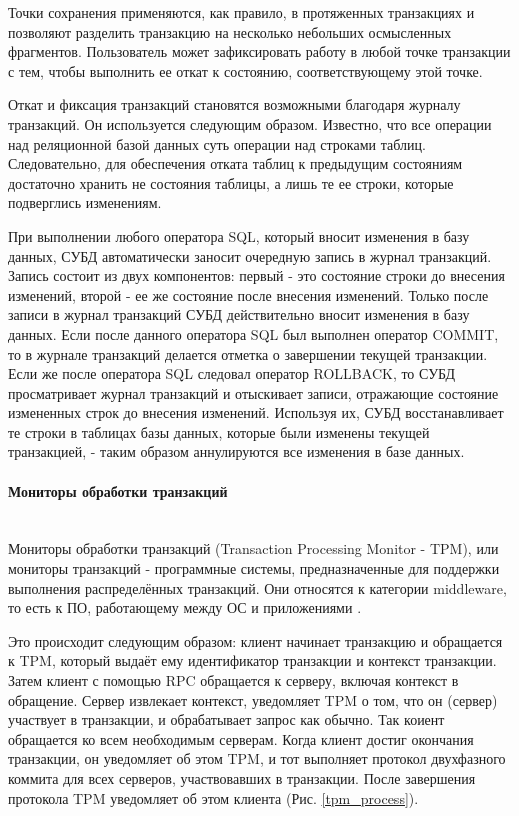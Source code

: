 Точки сохранения применяются, как правило, в протяженных транзакциях и позволяют разделить транзакцию на несколько
небольших осмысленных фрагментов. Пользователь может зафиксировать работу в любой точке транзакции с тем,
чтобы выполнить ее откат к состоянию, соответствующему этой точке.

Откат и фиксация транзакций становятся возможными благодаря журналу транзакций. Он используется следующим образом.
Известно, что все операции над реляционной базой данных суть операции над строками таблиц. Следовательно,
для обеспечения отката таблиц к предыдущим состояниям достаточно хранить не состояния таблицы, а лишь те
ее строки, которые подверглись изменениям.

При выполнении любого оператора SQL, который вносит изменения в базу данных, СУБД автоматически заносит
очередную запись в журнал транзакций. Запись состоит из двух компонентов: первый - это состояние строки до
внесения изменений, второй - ее же состояние после внесения изменений. Только после записи в журнал транзакций
СУБД действительно вносит изменения в базу данных. Если после данного оператора SQL был выполнен оператор
COMMIT, то в журнале транзакций делается отметка о завершении текущей транзакции. Если же после
оператора SQL следовал оператор ROLLBACK, то СУБД просматривает журнал транзакций и отыскивает записи,
отражающие состояние измененных строк до внесения изменений. Используя их, СУБД восстанавливает те
строки в таблицах базы данных, которые были изменены текущей транзакцией, - таким образом
аннулируются все изменения в базе данных.

\paragraph{Мониторы обработки транзакций}~\\
Мониторы обработки транзакций (Transaction Processing Monitor - TPM), или мониторы
транзакций - программные системы, предназначенные для поддержки выполнения распределённых транзакций.
Они относятся к категории middleware, то есть к ПО, работающему между ОС и приложениями \autocite{TransactionMonitors}.

Это происходит следующим образом: клиент начинает транзакцию и обращается к TPM, который выдаёт ему
идентификатор транзакции и контекст транзакции. Затем клиент с помощью RPC обращается к серверу,
включая контекст в обращение. Сервер извлекает контекст, уведомляет TPM о том, что он (сервер) участвует
в транзакции, и обрабатывает запрос как обычно. Так коиент обращается ко всем необходимым серверам. 
Когда клиент достиг окончания транзакции, он уведомляет об этом TPM, и тот выполняет протокол двухфазного коммита
для всех серверов, участвовавших в транзакции. После завершения протокола TPM уведомляет об этом клиента (Рис. \ref{tpm_process}). \autocite{WebServices}

